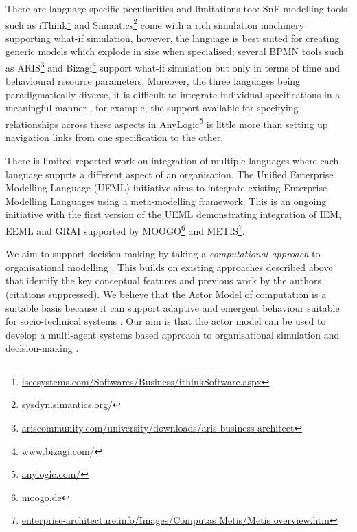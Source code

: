 \documentclass[10pt,numbers]{sigplanconf}
\begin{document}
There are language-specific peculiarities and limitations too: SnF modelling tools such as iThink\footnote{\url{iseesystems.com/Softwares/Business/ithinkSoftware.aspx}} and Simantics\footnote{\url{sysdyn.simantics.org/}} come with a rich simulation machinery supporting what-if simulation, however, the language is best suited for creating generic models which explode in size when specialised; several BPMN tools such as ARIS\footnote{\url{ariscommunity.com/university/downloads/aris-business-architect}} and Bizagi\footnote{\url{www.bizagi.com/}} support what-if simulation but only in terms of time and behavioural resource parameters. Moreover, the three languages being paradigmatically diverse, it is difficult to integrate individual specifications in a meaningful manner \cite{chen2008architectures,fox1993issues,barjis2008enterprise}, for example, the support available for specifying relationships across these aspects in AnyLogic\footnote{\url{anylogic.com/}} is little more than setting up navigation links from one specification to the other.

There is limited reported work on integration of multiple languages where each language supprts a different aspect of an organisation. The Unified Enterprise Modelling Language (UEML) \cite{vernadat2002ueml} initiative aims to integrate existing Enterprise Modelling Languages using a meta-modelling framework. This is an ongoing initiative \cite{opdahl2007roadmap} with the first version of the UEML demonstrating integration of IEM, EEML and GRAI \cite{doumeingts1993gim} supported by MOOGO\footnote{\url{moogo.de}} and METIS\footnote{\url{enterprise-architecture.info/Images/Computas Metis/Metis overview.htm}}.

We aim to support decision-making by taking a {\it computational approach} to organisational modelling \cite{weinhardt2012computational}. This builds on existing approaches described above that identify the key conceptual features and previous work by the authors 
(citations suppressed).
We believe that the Actor Model of computation \cite{hewitt2010actor} is a suitable basis because it can support adaptive and emergent behaviour suitable for socio-technical systems \cite{gill2015adaptive,beese2015conceptualization}. Our aim is that the actor model can be used to develop a multi-agent systems based approach to organisational simulation and decision-making \cite{lee2015complexities,tan2013framework,camarinha2001virtual}.
\end{document}

